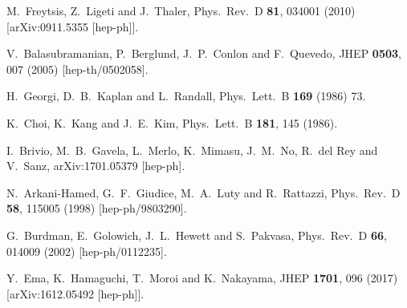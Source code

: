 \documentclass[preprint,prd,aps,tighten,nofootinbib,amssymb]{revtex4}
\begin{document}
\begin{thebibliography}{99}
  M.~Freytsis, Z.~Ligeti and J.~Thaler,
  Phys.\ Rev.\ D {\bf 81}, 034001 (2010)
  [arXiv:0911.5355 [hep-ph]].
  
  V.~Balasubramanian, P.~Berglund, J.~P.~Conlon and F.~Quevedo,
  JHEP {\bf 0503}, 007 (2005)
  [hep-th/0502058].

  H.~Georgi, D.~B.~Kaplan and L.~Randall,
  Phys.\ Lett.\ B {\bf 169} (1986) 73.


  K.~Choi, K.~Kang and J.~E.~Kim,
  Phys.\ Lett.\ B {\bf 181}, 145 (1986).
  
  
  I.~Brivio, M.~B.~Gavela, L.~Merlo, K.~Mimasu, J.~M.~No, R.~del Rey and V.~Sanz,
  arXiv:1701.05379 [hep-ph].
  
  N.~Arkani-Hamed, G.~F.~Giudice, M.~A.~Luty and R.~Rattazzi,
  Phys.\ Rev.\ D {\bf 58}, 115005 (1998)
  [hep-ph/9803290].
  
  G.~Burdman, E.~Golowich, J.~L.~Hewett and S.~Pakvasa,
  Phys.\ Rev.\ D {\bf 66}, 014009 (2002)
  [hep-ph/0112235].
  
  Y.~Ema, K.~Hamaguchi, T.~Moroi and K.~Nakayama,
  JHEP {\bf 1701}, 096 (2017)
  [arXiv:1612.05492 [hep-ph]].
  

\end{thebibliography}
\end{document}
